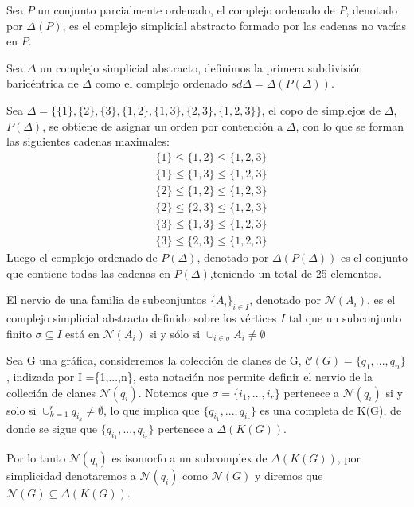 \begin{Defi}
Sea $P$ un conjunto parcialmente ordenado, el complejo ordenado de $P$, denotado por $\Delta(P)$, es el complejo simplicial abstracto formado por las cadenas no vacías en $P$.
\end{Defi}
\begin{Defi}
Sea $\Delta$ un complejo simplicial abstracto, definimos la primera subdivisión baricéntrica de $\Delta$ como el complejo ordenado $sd\Delta = \Delta(P(\Delta))$.
\end{Defi}
\begin{Ejem}
Sea $\Delta = \{\{1\},\{2\},\{3\},\{1,2\},\{1,3\},\{2,3\},\{1,2,3\}\}$, el copo de simplejos de $\Delta$, $P(\Delta)$, se obtiene de asignar un orden por contención a $\Delta$, con lo que se forman las siguientes cadenas maximales:
\begin{align*}
&\{1\}\leq\{1,2\}\leq\{1,2,3\}\\
&\{1\}\leq\{1,3\}\leq\{1,2,3\}\\
&\{2\}\leq\{1,2\}\leq\{1,2,3\}\\
&\{2\}\leq\{2,3\}\leq\{1,2,3\}\\
&\{3\}\leq\{1,3\}\leq\{1,2,3\}\\
&\{3\}\leq\{2,3\}\leq\{1,2,3\}
\end{align*}
Luego el complejo ordenado de $P(\Delta)$, denotado por $\Delta(P(\Delta))$ es el conjunto que contiene todas las cadenas en $P(\Delta)$,teniendo un total de 25 elementos.
\end{Ejem}

\begin{Defi} 
El nervio de una familia de subconjuntos ${\{A_i\}}_{i\in I}$, denotado por $\mathcal{N}(A_i)$, es el complejo simplicial abstracto definido sobre los vértices $I$ tal que un subconjunto finito $\sigma \subseteq I$ está en $\mathcal{N}(A_i)$ si y sólo si ${\cup}_{i\in \sigma}A_i \neq \emptyset$
\end{Defi}
\begin{Ejem}
Sea G una gráfica, consideremos la colección de clanes de G, $\mathcal{C}(G) = \{q_1,...,q_n\}$, indizada por I =\{1,...,n\}, esta notación nos permite definir el nervio de la colleción de clanes $\mathcal{N}(q_i)$. Notemos que $\sigma = \{i_1,...,i_r\}$ pertenece a $\mathcal{N}(q_i)$ si y solo si $\cup_{k=1}^{r}q_{i_k}\neq\emptyset$, lo que implica que $\{q_{i_1},...,q_{i_r}\}$ es una completa de K(G), de donde se sigue que $\{q_{i_1},...,q_{i_r}\}$ pertenece a $\Delta(K(G))$.

Por lo tanto $\mathcal{N}(q_i)$ es isomorfo a un subcomplex de $\Delta(K(G))$, por simplicidad denotaremos a $\mathcal{N}(q_i)$ como $\mathcal{N}(G)$ y diremos que $\mathcal{N}(G)\subseteq \Delta(K(G))$.
\end{Ejem}

